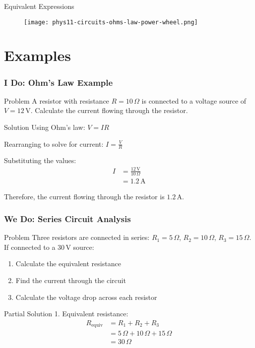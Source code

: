 \documentclass{beamer}
\begin{document}
\begin{frame}
\begin{alertblock}{Equivalent Expressions}
\begin{figure}
    \centering
    \texttt{[image: phys11-circuits-ohms-law-power-wheel.png]}
\end{figure}
\end{alertblock}
\end{frame}

\section{Examples}

\begin{frame}
\frametitle{I Do: Ohm's Law Example}
\begin{exampleblock}{Problem}
A resistor with resistance $R = 10 \, \Omega$ is connected to a voltage source of $V = 12 \, \text{V}$. Calculate the current flowing through the resistor.
\end{exampleblock}
\pause
\begin{block}{Solution}
Using Ohm's law: $V = IR$

Rearranging to solve for current: $I = \frac{V}{R}$

Substituting the values:
\begin{align}
I &= \frac{12 \, \text{V}}{10 \, \Omega} \\
&= 1.2 \, \text{A}
\end{align}

Therefore, the current flowing through the resistor is $1.2 \, \text{A}$.
\end{block}
\end{frame}

\begin{frame}
\frametitle{We Do: Series Circuit Analysis}
\begin{exampleblock}{Problem}
Three resistors are connected in series: $R_1 = 5 \, \Omega$, $R_2 = 10 \, \Omega$, $R_3 = 15 \, \Omega$. If connected to a $30 \, \text{V}$ source:
\begin{enumerate}
\item Calculate the equivalent resistance
\item Find the current through the circuit
\item Calculate the voltage drop across each resistor
\end{enumerate}
\end{exampleblock}

\begin{block}{Partial Solution}
1. Equivalent resistance:
\begin{align}
R_{\text{equiv}} &= R_1 + R_2 + R_3 \\
&= 5 \, \Omega + 10 \, \Omega + 15 \, \Omega \\
&= 30 \, \Omega
\end{align}


\end{block}
\end{frame}
\end{document}
